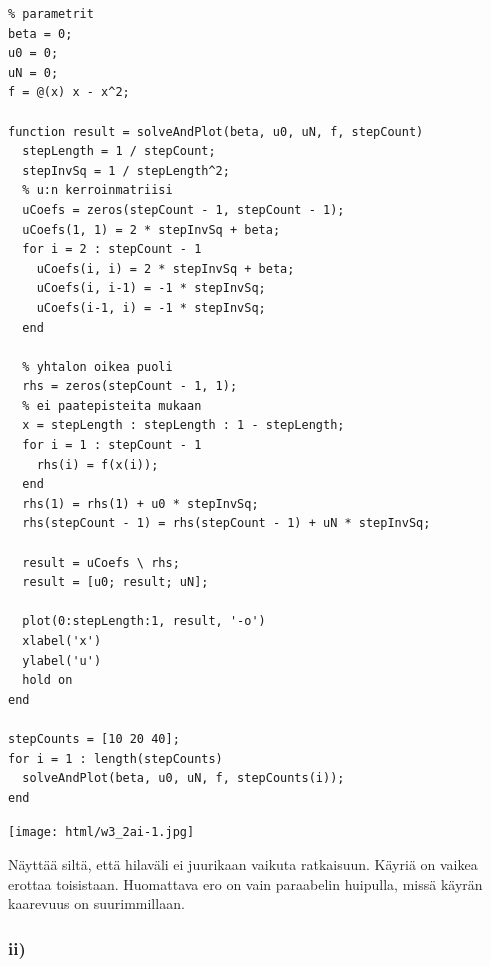 \documentclass{article}
\begin{document}
\begin{verbatim}
% parametrit
beta = 0;
u0 = 0;
uN = 0;
f = @(x) x - x^2;

function result = solveAndPlot(beta, u0, uN, f, stepCount)
  stepLength = 1 / stepCount;
  stepInvSq = 1 / stepLength^2;
  % u:n kerroinmatriisi
  uCoefs = zeros(stepCount - 1, stepCount - 1);
  uCoefs(1, 1) = 2 * stepInvSq + beta;
  for i = 2 : stepCount - 1
    uCoefs(i, i) = 2 * stepInvSq + beta;
    uCoefs(i, i-1) = -1 * stepInvSq;
    uCoefs(i-1, i) = -1 * stepInvSq;
  end

  % yhtalon oikea puoli
  rhs = zeros(stepCount - 1, 1);
  % ei paatepisteita mukaan
  x = stepLength : stepLength : 1 - stepLength;
  for i = 1 : stepCount - 1
    rhs(i) = f(x(i));
  end
  rhs(1) = rhs(1) + u0 * stepInvSq;
  rhs(stepCount - 1) = rhs(stepCount - 1) + uN * stepInvSq;

  result = uCoefs \ rhs;
  result = [u0; result; uN];

  plot(0:stepLength:1, result, '-o')
  xlabel('x')
  ylabel('u')
  hold on
end

stepCounts = [10 20 40];
for i = 1 : length(stepCounts)
  solveAndPlot(beta, u0, uN, f, stepCounts(i));
end
\end{verbatim}

\begin{center}
\texttt{[image: html/w3\_2ai-1.jpg]}
\end{center}

Näyttää siltä, että hilaväli ei juurikaan vaikuta ratkaisuun.
Käyriä on vaikea erottaa toisistaan. Huomattava ero on vain paraabelin
huipulla, missä käyrän kaarevuus on suurimmillaan.

\subsubsection*{ii)}
\end{document}
